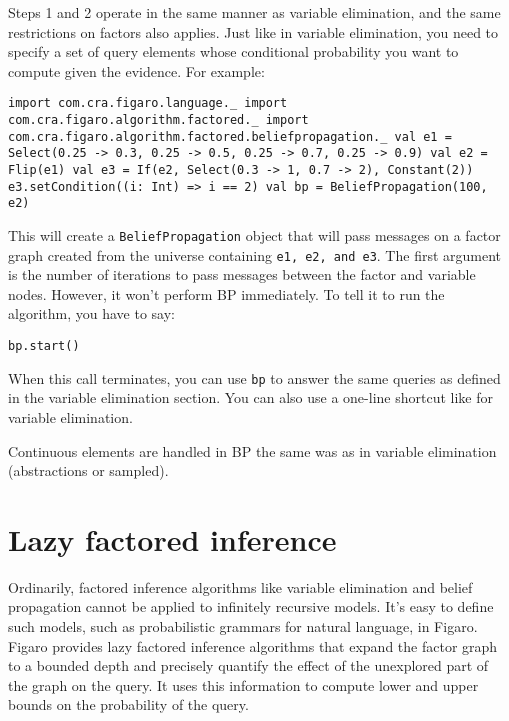 Steps 1 and 2 operate in the same manner as variable elimination, and the same restrictions on factors also applies. Just like in variable elimination, you need to specify a set of query elements whose conditional probability you want to compute given the evidence. For example:

\begin{flushleft}
\texttt{import com.cra.figaro.language.\_
\newline import com.cra.figaro.algorithm.factored.\_
\newline import com.cra.figaro.algorithm.factored.beliefpropagation.\_
\newline 
\newline val e1 = Select(0.25 -> 0.3, 0.25 -> 0.5, 0.25 -> 0.7, 0.25 -> 0.9)
\newline val e2 = Flip(e1)
\newline val e3 = If(e2, Select(0.3 -> 1, 0.7 -> 2), Constant(2))
\newline e3.setCondition((i: Int) => i == 2)
\newline 
\newline val bp = BeliefPropagation(100, e2)}
\end{flushleft}

This will create a \texttt{BeliefPropagation} object that will pass messages on a factor graph created from the universe containing \texttt{e1, e2, and e3}. The first argument is the number of iterations to pass messages between the factor and variable nodes. However, it won't perform BP immediately. To tell it to run the algorithm, you have to say:

\begin{flushleft}
\texttt{bp.start()}
\end{flushleft}

When this call terminates, you can use \texttt{bp} to answer the same queries as defined in the variable elimination section. You can also use a one-line shortcut like for variable elimination.

Continuous elements are handled in BP the same was as in variable elimination (abstractions or sampled).

\section{Lazy factored inference}
\label{LazyFactoredInference}

Ordinarily, factored inference algorithms like variable elimination and belief propagation cannot be applied to infinitely recursive models. It's easy to define such models, such as probabilistic grammars for natural language, in Figaro. Figaro provides lazy factored inference algorithms that expand the factor graph to a bounded depth and precisely quantify the effect of the unexplored part of the graph on the query. It uses this information to compute lower and upper bounds on the probability of the query. 

